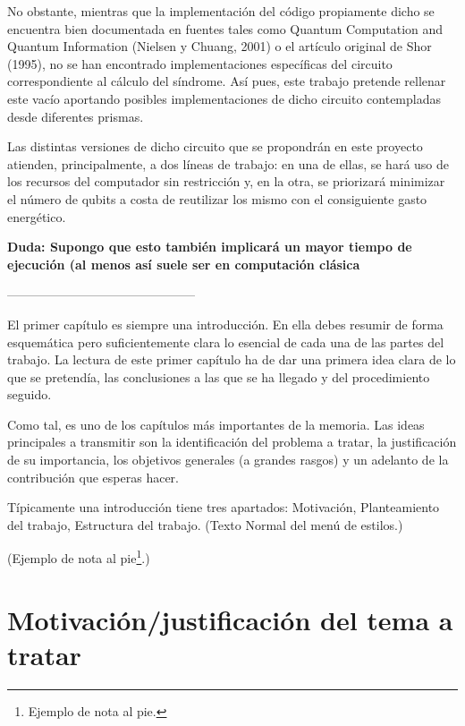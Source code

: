 No obstante, mientras que la implementación del código propiamente dicho se encuentra bien documentada en fuentes tales como Quantum Computation and Quantum Information (Nielsen y Chuang, 2001) o el artículo original de Shor (1995), no se han encontrado implementaciones específicas del circuito correspondiente al cálculo del síndrome. Así pues, este trabajo pretende rellenar este vacío aportando posibles implementaciones de dicho circuito contempladas desde diferentes prismas. 

Las distintas versiones de dicho circuito que se propondrán en este proyecto atienden, principalmente, a dos líneas de trabajo: en una de ellas, se hará uso de los recursos del computador sin restricción y, en la otra, se priorizará minimizar el número de qubits a costa de reutilizar los mismo con el consiguiente gasto energético. 



\textbf{Duda: Supongo que esto también implicará un mayor tiempo de ejecución (al menos así suele ser en computación clásica}

















---------------------------------------------

El primer capítulo es siempre una introducción. En ella debes resumir de forma esquemática pero suficientemente clara lo esencial de cada una de las partes del trabajo. La lectura de este primer capítulo ha de dar una primera idea clara de lo que se pretendía, las conclusiones a las que se ha llegado y del procedimiento seguido.

Como tal, es uno de los capítulos más importantes de la memoria. Las ideas principales a transmitir son la identificación del problema a tratar, la justificación de su importancia, los objetivos generales (a grandes rasgos) y un adelanto de la contribución que esperas hacer.

Típicamente una introducción tiene tres apartados: Motivación, Planteamiento del trabajo, Estructura del trabajo. (Texto Normal del menú de estilos.)

(Ejemplo de nota al pie\footnote{Ejemplo de nota al pie.}.)

\section{Motivación/justificación del tema a tratar}


